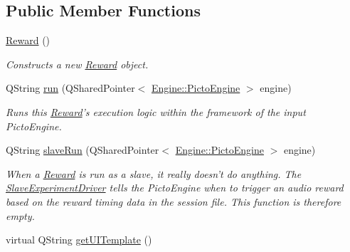 \subsection*{Public Member Functions}
\begin{DoxyCompactItemize}
\item 
\hyperlink{class_picto_1_1_reward_acc1d1c8281f093340b42414957376654}{Reward} ()
\begin{DoxyCompactList}\small\item\em Constructs a new \hyperlink{class_picto_1_1_reward}{Reward} object. \end{DoxyCompactList}\item 
Q\-String \hyperlink{class_picto_1_1_reward_a2b250d60f1d51b31360f5a7c8f4c5eec}{run} (Q\-Shared\-Pointer$<$ \hyperlink{class_picto_1_1_engine_1_1_picto_engine}{Engine\-::\-Picto\-Engine} $>$ engine)
\begin{DoxyCompactList}\small\item\em Runs this \hyperlink{class_picto_1_1_reward}{Reward}'s execution logic within the framework of the input Picto\-Engine. \end{DoxyCompactList}\item 
\hypertarget{class_picto_1_1_reward_a22c9f49f9f942011a175798753c9995f}{Q\-String \hyperlink{class_picto_1_1_reward_a22c9f49f9f942011a175798753c9995f}{slave\-Run} (Q\-Shared\-Pointer$<$ \hyperlink{class_picto_1_1_engine_1_1_picto_engine}{Engine\-::\-Picto\-Engine} $>$ engine)}\label{class_picto_1_1_reward_a22c9f49f9f942011a175798753c9995f}

\begin{DoxyCompactList}\small\item\em When a \hyperlink{class_picto_1_1_reward}{Reward} is run as a slave, it really doesn't do anything. The \hyperlink{class_picto_1_1_slave_experiment_driver}{Slave\-Experiment\-Driver} tells the Picto\-Engine when to trigger an audio reward based on the reward timing data in the session file. This function is therefore empty. \end{DoxyCompactList}\item 
\hypertarget{class_picto_1_1_reward_ad90e7d9025dc24e1e39c1e0590c32509}{virtual Q\-String \hyperlink{class_picto_1_1_reward_ad90e7d9025dc24e1e39c1e0590c32509}{get\-U\-I\-Template} ()}\label{class_picto_1_1_reward_ad90e7d9025dc24e1e39c1e0590c32509}


\end{DoxyCompactItemize}
